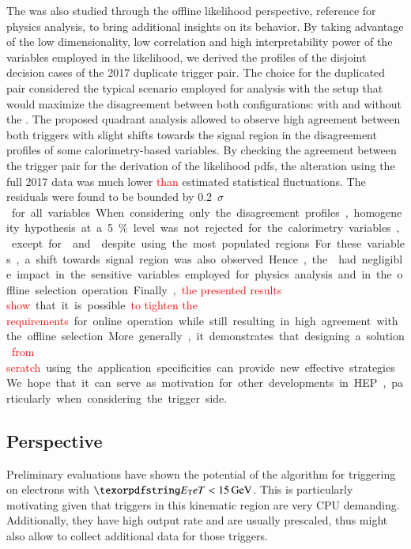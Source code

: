 The \rnn{} was also studied through the offline likelihood perspective,
reference for physics analysis, to bring additional insights on its behavior. By
taking advantage of the low dimensionality, low correlation and high
interpretability power of the variables employed in the likelihood, we derived
the profiles of the disjoint decision cases of the 2017 duplicate trigger pair.
The choice for the duplicated pair considered the typical scenario employed for
analysis with the setup that would maximize the disagreement between both
configurations: with and without the \rnn{}. The proposed quadrant analysis
allowed to observe high agreement between both triggers with slight shifts
towards the signal region in the disagreement profiles of some calorimetry-based
variables. By checking the agreement between the trigger pair for the derivation
of the likelihood pdfs, the alteration using the full 2017 data was much lower
\textcolor{red}{than} estimated statistical fluctuations. The residuals were found to be bounded
by \SI{0.2}{$\sigma$} for all variables. When considering only the
disagreement profiles, homogeneity hypothesis at a \SI{5}{\%} level was not
rejected for the calorimetry variables, except for \reta{} and \rhad{} despite
using the most populated regions. For these variables, a shift towards signal
region was also observed. Hence, the \rnn{} had negligible impact in the
sensitive variables employed for physics analysis and in the offline selection
operation.

Finally, \textcolor{red}{the presented results show} that it is possible \textcolor{red}{to tighten the requirements} for online operation while still resulting in high agreement with the offline
selection. More generally, it demonstrates that designing a solution \textcolor{red}{from scratch} using the application specificities can provide new effective
strategies. We hope that it can serve as motivation for other developments in
HEP, particularly when considering the trigger side.

\subsection{Perspective}







Preliminary evaluations have shown the potential of the \rnn{} algorithm for
triggering on electrons with $\et<\SI{15}{\GeV}$. This is particularly motivating given that triggers in this kinematic region are very
CPU demanding. Additionally, they have high output rate and are usually
prescaled, thus \rnn{} might also allow to collect additional data for those
triggers.


